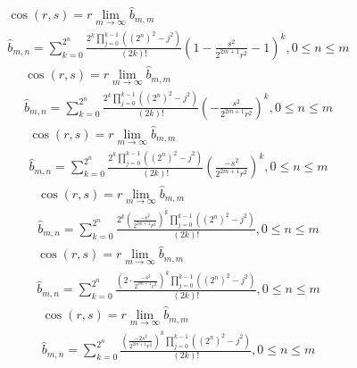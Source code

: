 \documentclass[a4paper,12pt]{report}
\begin{document}
\begin{subequations}
\begin{gather}
\cos(r,s) = r \lim \limits_{m \to \infty} \hat{b}_{m,m} \\
\hat{b}_{m,n} = \sum \limits_{k=0}^{2^n} \frac{2^k \prod \limits_{j=0}^{k-1} ((2^n)^2 - j^2)}{(2k)!} \left(1 - \frac{s^2}{2^{2m+1}r^2} - 1\right)^k, 0 \leq n \leq m
\end{gather}
\end{subequations}
\begin{subequations}
\begin{gather}
\cos(r,s) = r \lim \limits_{m \to \infty} \hat{b}_{m,m} \\
\hat{b}_{m,n} = \sum \limits_{k=0}^{2^n} \frac{2^k \prod \limits_{j=0}^{k-1} ((2^n)^2 - j^2)}{(2k)!} \left(-\frac{s^2}{2^{2m+1}r^2}\right)^k, 0 \leq n \leq m
\end{gather}
\end{subequations}
\begin{subequations}
\begin{gather}
\cos(r,s) = r \lim \limits_{m \to \infty} \hat{b}_{m,m} \\
\hat{b}_{m,n} = \sum \limits_{k=0}^{2^n} \frac{2^k \prod \limits_{j=0}^{k-1} ((2^n)^2 - j^2)}{(2k)!} \left(\frac{-s^2}{2^{2m+1}r^2}\right)^k, 0 \leq n \leq m
\end{gather}
\end{subequations}
\begin{subequations}
\begin{gather}
\cos(r,s) = r \lim \limits_{m \to \infty} \hat{b}_{m,m} \\
\hat{b}_{m,n} = \sum \limits_{k=0}^{2^n} \frac{2^k \left(\frac{-s^2}{2^{2m+1}r^2}\right)^k \prod \limits_{j=0}^{k-1} ((2^n)^2 - j^2)}{(2k)!}, 0 \leq n \leq m
\end{gather}
\end{subequations}
\begin{subequations}
\begin{gather}
\cos(r,s) = r \lim \limits_{m \to \infty} \hat{b}_{m,m} \\
\hat{b}_{m,n} = \sum \limits_{k=0}^{2^n} \frac{\left(2 \cdot \frac{-s^2}{2^{2m+1}r^2}\right)^k \prod \limits_{j=0}^{k-1} ((2^n)^2 - j^2)}{(2k)!}, 0 \leq n \leq m
\end{gather}
\end{subequations}
\begin{subequations}
\begin{gather}
\cos(r,s) = r \lim \limits_{m \to \infty} \hat{b}_{m,m} \\
\hat{b}_{m,n} = \sum \limits_{k=0}^{2^n} \frac{\left(\frac{-2s^2}{2^{2m+1}r^2}\right)^k \prod \limits_{j=0}^{k-1} ((2^n)^2 - j^2)}{(2k)!}, 0 \leq n \leq m
\end{gather}
\end{subequations}
\end{document}
